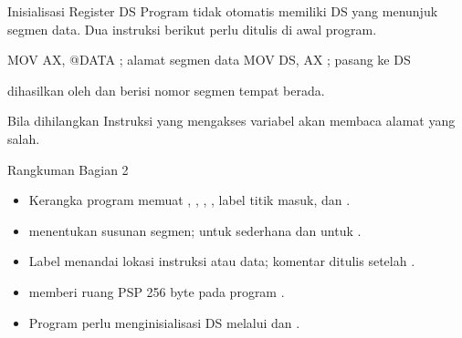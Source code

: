 \documentclass[aspectratio=169,11pt]{beamer}
\begin{document}
\begin{frame}[fragile]{Inisialisasi Register DS}
\small
Program  tidak otomatis memiliki DS yang menunjuk segmen
data. Dua instruksi berikut perlu ditulis di awal program.

\vspace{0.3em}
\begin{kodeasm}[numbers=none]
MOV AX, @DATA       ; alamat segmen data
MOV DS, AX          ; pasang ke DS
\end{kodeasm}

\vspace{0.2em}
 dihasilkan oleh  dan berisi nomor segmen
tempat  berada.

\begin{alertblock}{Bila dihilangkan}
\small Instruksi yang mengakses variabel akan membaca alamat yang
salah.
\end{alertblock}
\end{frame}

\begin{frame}{Rangkuman Bagian 2}
\small
\begin{itemize}
    \item Kerangka program memuat , ,
          , , label titik masuk, dan
          .

    \vspace{0.15em}
    \item {} menentukan susunan segmen;  untuk
           sederhana dan  untuk .

    \vspace{0.15em}
    \item Label menandai lokasi instruksi atau data; komentar
          ditulis setelah \code{;}.

    \vspace{0.15em}
    \item {} memberi ruang PSP 256 byte pada program
          .

    \vspace{0.15em}
    \item Program  perlu menginisialisasi DS melalui
           dan .
\end{itemize}
\end{frame}
\end{document}
